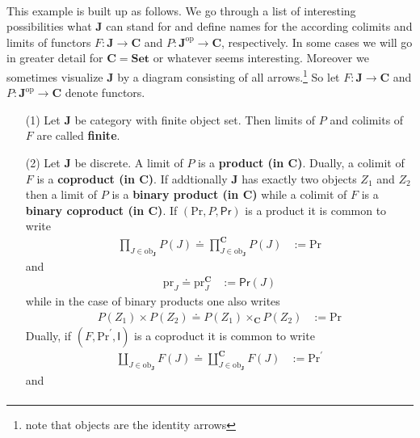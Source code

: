 \\
\begin{exa}
\label{exa:oflimits}
This example is built up as follows. We go through a list of interesting possibilities what $\mathbf{J}$ can stand for and define names for the according colimits and limits of functors $F \colon \mathbf{J} \rightarrow \mathbf{C}$ and $P \colon \mathbf{J}^{\mathrm{op}} \rightarrow \mathbf{C}$, respectively. In some cases we will go in greater detail for $\mathbf{C} = \mathbf{Set}$ or whatever seems interesting. Moreover we sometimes visualize $\mathbf{J}$ by a diagram consisting of all arrows.\footnote{note that objects are the identity arrows} So let $F \colon \mathbf{J} \rightarrow \mathbf{C}$ and $P \colon \mathbf{J}^{\mathrm{op}} \rightarrow \mathbf{C}$ denote functors.
\begin{enumerate}
\item[(1)]
Let $\mathbf{J}$ be category with finite object set. Then limits of $P$ and colimits of $F$ are called \textbf{finite}.
\item[(2)]
Let $\mathbf{J}$ be discrete. A limit of $P$ is a \textbf{product (in $\mathbf{C}$)}. Dually, a colimit of $F$ is a \textbf{coproduct (in $\mathbf{C}$)}. If addtionally $\mathbf{J}$ has exactly two objects $Z_{1}$ and $Z_{2}$ then a limit of $P$ is a \textbf{binary product (in $\mathbf{C}$)} while a colimit of $F$ is a \textbf{binary coproduct (in $\mathbf{C}$)}. If $(\mathrm{Pr},P,\mathsf{Pr})$ is a product it is common to write
\begin{align*}
  \prod_{J \in \mathrm{ob}_{\mathbf{J}}}
  P(J)
  \doteq
  \prod_{J \in \mathrm{ob}_{\mathbf{J}}}^{\mathbf{C}}
  P(J)
  &:=
  \mathrm{Pr}
\end{align*}
and
\begin{align*}
  \mathrm{pr}_{J}
  \doteq
  \mathrm{pr}_{J}^{\mathbf{C}}
  &:=
  \mathsf{Pr}(J)
\end{align*}
while in the case of binary products one also writes
\begin{align*}
  P(Z_{1})
  \times
  P(Z_{2})
  \doteq
  P(Z_{1})
  \times_{\mathbf{C}}
  P(Z_{2})
  &:=
  \mathrm{Pr}
\end{align*}
Dually, if $(F,\mathrm{Pr}^{\prime},\mathsf{I})$ is a coproduct it is common to write
\begin{align*}
  \coprod_{J \in \mathrm{ob}_{\mathbf{J}}}
  F(J)
  \doteq
  \coprod_{J \in \mathrm{ob}_{\mathbf{J}}}^{\mathbf{C}}
  F(J)
  &:=
  \mathrm{Pr}^{\prime}
\end{align*}
and
\begin{align*}

\end{align*}
\end{enumerate}
\end{exa}
